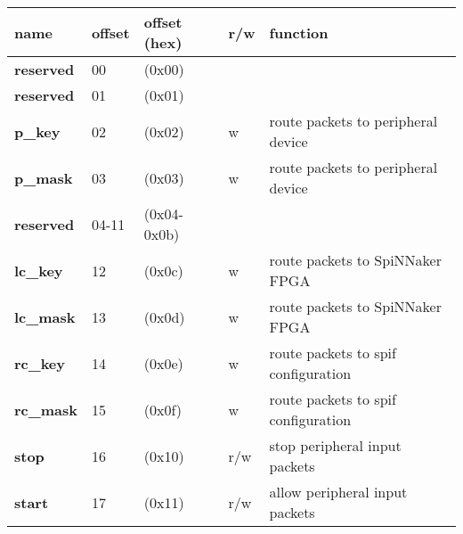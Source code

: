 \documentclass[11pt,a4paper,twoside]{article}
\begin{document}
\begin{center}
	\begin{tabularx}{\textwidth}{| p{34mm} p{13mm} p{21mm} p{7mm} X |}
		\hline
		\textbf{name} & \textbf{offset} & \textbf{offset} (hex) & \textbf{r/w} & \textbf{function} \\%
		\hline
		\hline
		\cellcolor{gray!25}\textbf{reserved} & \cellcolor{gray!25}00    & \cellcolor{gray!25}(0x00)       & \cellcolor{gray!25} & \cellcolor{gray!25}\\%
		\cellcolor{gray!25}\textbf{reserved} & \cellcolor{gray!25}01    & \cellcolor{gray!25}(0x01)       & \cellcolor{gray!25} & \cellcolor{gray!25}\\%
		\textbf{p\_key}                      & 02                       & (0x02)                          & w                   & route packets to peripheral device             \\%
		\textbf{p\_mask}                     & 03                       & (0x03)                          & w                   & route packets to peripheral device             \\%
		\cellcolor{gray!25}\textbf{reserved} & \cellcolor{gray!25}04-11 & \cellcolor{gray!25} (0x04-0x0b) & \cellcolor{gray!25} & \cellcolor{gray!25}\\%
		\textbf{lc\_key}                     & 12                       & (0x0c)                          & w                   & route packets to SpiNNaker FPGA  \\%
		\textbf{lc\_mask}                    & 13                       & (0x0d)                          & w                   & route packets to SpiNNaker FPGA  \\%
		\textbf{rc\_key}                     & 14                       & (0x0e)                          & w                   & route packets to spif configuration   \\%
		\textbf{rc\_mask}                    & 15                       & (0x0f)                          & w                   & route packets to spif configuration   \\%
		\textbf{stop}                        & 16                       & (0x10)                          & r/w                 & stop peripheral input packets         \\%
		\textbf{start}                       & 17                       & (0x11)                          & r/w                 & allow peripheral input packets         \\%
		\hline
	\end{tabularx}
\end{center}
\end{document}
